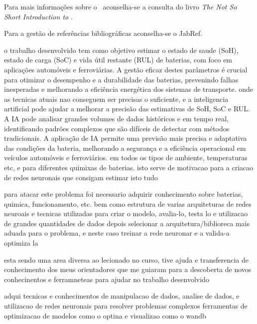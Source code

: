 Para mais informações sobre o \LaTeXe\ aconselha-se a consulta do livro \emph{The Not So Short Introduction to \LaTeXe} \parencite{oetiker2000nss}.

Para a gestão de referências bibliográficas aconselha-se o JabRef. %

o trabalho desenvolvido tem como objetivo estimar o estado de saude (SoH), estado de carga (SoC) e vida útil restante (RUL) de baterias, com foco em aplicações automóveis e ferroviárias. A gestão eficaz destes parâmetros é crucial para otimizar o desempenho e a durabilidade das baterias, prevenindo falhas inesperadas e melhorando a eficiência energética dos sistemas de transporte.
onde as tecnicas atuais nao conseguem ser precisas o suficiente, e a inteligencia artificial pode ajudar a melhorar a precisão das estimativas de SoH, SoC e RUL. A IA pode analisar grandes volumes de dados históricos e em tempo real, identificando padrões complexos que são difíceis de detectar com métodos tradicionais. A aplicação de IA permite uma previsão mais precisa e adaptativa das condições da bateria, melhorando a segurança e a eficiência operacional em veículos automóveis e ferroviários.
em todos os tipos de ambiente, temperaturas etc, e para diferentes quimixas de baterias.
isto serve de motivacao para a criacao de redes neuronais que consigam estimar isto tudo

para atacar este problema foi necessario adquirir conhecimento sobre baterias, quimica, funcionamento, etc.
bem como estrutura de varias arquiteturas de redes neuroais e tecnicas utilizadas para criar o modelo, avalia-lo, testa lo e utilizacao de grandes quantidades de dados
depois selecionar a arquitetura/biblioreca mais aduada para o problema, e neste caso treinar a rede neuronar e a valida-a optimiza la 

esta sendo uma area diversa ao lecionado no curso, tive ajuda e transferencia de conhecimento dos meus orientadores que me guiaram para a descoberta de novos conhecinentos e ferramneteas para ajudar no trabalho desenvolvido

adqui tecnicas e conhecimentos de manipulacao de dados, analise de dados, e utilizacao de redes neuronais para resolver problemas complexos
ferramentas de  optimizacao de modelos como o optina e visualizao como o wandb